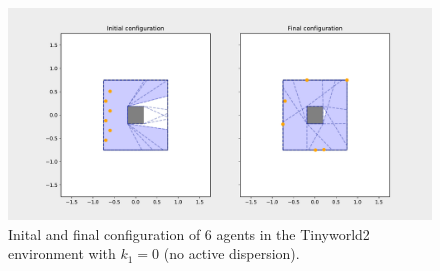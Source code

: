 \begin{figure}[H]
  \centering
  \includegraphics[width=\textwidth]{figs/tinyworld2_6_agnt_k_1_0_k_2_1_distr.pdf}
  \caption{Inital and final configuration of 6 agents in the Tinyworld2 environment with $k_{1} = 0$ (no active dispersion).}
  \label{fig:6_agnt_tw2_k_1_0_distr}
\end{figure}
